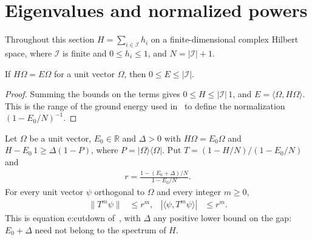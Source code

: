 \section{Eigenvalues and normalized powers}
\label{sec:contraction_sums_power}

Throughout this section $H=\sum_{i\in\mathcal I}h_i$ on a finite-dimensional
complex Hilbert space, where $\mathcal I$ is finite and $0\le h_i\le1$, and
$N=|\mathcal I|+1$.

\begin{lemma}
    \label{thm:positive_sum_eigenvalue_range}
    \leanok
    If $H\Omega=E\Omega$ for a unit vector $\Omega$, then
    $0\le E\le|\mathcal I|$.
\end{lemma}

\begin{proof}
    \leanok
    Summing the bounds on the terms gives $0\le H\le|\mathcal I|\,1$, and
    $E=\langle\Omega,H\Omega\rangle$. This is the range of the ground energy
    used in~\cite[lines 283--284 and 607]{Landau2013PolynomialTime} to define
    the normalization $(1-E_0/N)^{-1}$.
\end{proof}

\begin{theorem}
    \label{thm:physical_power_filter_lower_gap_cutdown}
    \leanok
    Let $\Omega$ be a unit vector, $E_0\in\mathbb R$ and $\Delta>0$ with
    $H\Omega=E_0\Omega$ and $H-E_0\,1\ge\Delta(1-P)$, where
    $P=|\Omega\rangle\langle\Omega|$. Put $T=(1-H/N)/(1-E_0/N)$ and
    \begin{align*}
        r=\frac{1-(E_0+\Delta)/N}{1-E_0/N}.
    \end{align*}
    For every unit vector $\psi$ orthogonal to $\Omega$ and every integer
    $m\ge0$,
    \begin{align*}
        \|T^m\psi\|                  & \le r^m, &
        |\langle\psi,T^m\psi\rangle| & \le r^m.
    \end{align*}
    This is equation e:cutdown of~\cite[line 603]{Landau2013PolynomialTime},
    with $\Delta$ any positive lower bound on the gap: $E_0+\Delta$ need not
    belong to the spectrum of $H$.
\end{theorem}

